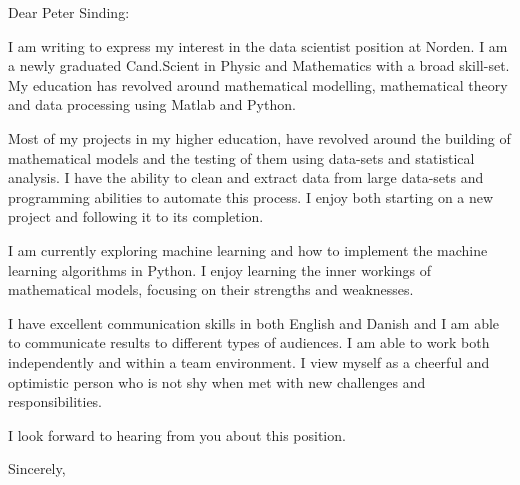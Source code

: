 \documentclass[10pt,a4paper]{letter}
\begin{document}
\begin{letter}{}
\opening{Dear Peter Sinding:}

I am writing to express my interest in the data scientist position at Norden. I am a newly graduated Cand.Scient in Physic and Mathematics with a broad skill-set. My education has revolved around mathematical modelling, mathematical theory and data processing using Matlab and Python.       
 
Most of my projects in my higher education, have revolved around the building of mathematical models and the testing of them using data-sets and statistical analysis. I have the ability to clean and extract data from large data-sets and programming abilities to automate this process. I enjoy both starting on a new project and following it to its completion. 

I am currently exploring machine learning and how to implement the machine learning algorithms in Python. I enjoy learning the inner workings of mathematical models, focusing on their strengths and weaknesses.  

I have excellent communication skills in both English and Danish and I am able to communicate results to different types of audiences. I am able to work both independently and within a team environment. I view myself as a cheerful and optimistic person who is not shy when met with new challenges and responsibilities.

I look forward to hearing from you about this position.   

\closing{Sincerely,}

\end{letter}
\end{document}

